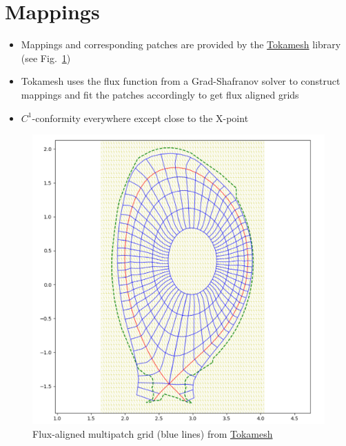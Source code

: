 \documentclass[presentation.tex]{subfiles}
\begin{document}
\section{Mappings}
\begin{itemize}
    \item Mappings and corresponding patches are provided by the \href{https://inria.hal.science/hal-01948060/document}{Tokamesh}
            library (see Fig.~\ref{fig:tokamesh_grid})
    \item Tokamesh uses the flux function from a Grad-Shafranov solver to construct mappings and 
            fit the patches accordingly to get flux aligned grids
    \item $C^1$-conformity everywhere except close to the X-point
\end{itemize}
\begin{figure}
    \centering
    \includegraphics[width=0.8 \textwidth]{images/tokamesh_grid.png}
    \caption{Flux-aligned multipatch grid (blue lines) 
             from \href{https://inria.hal.science/hal-01948060/document}{Tokamesh}}
    \label{fig:tokamesh_grid}
\end{figure}
\end{document}
